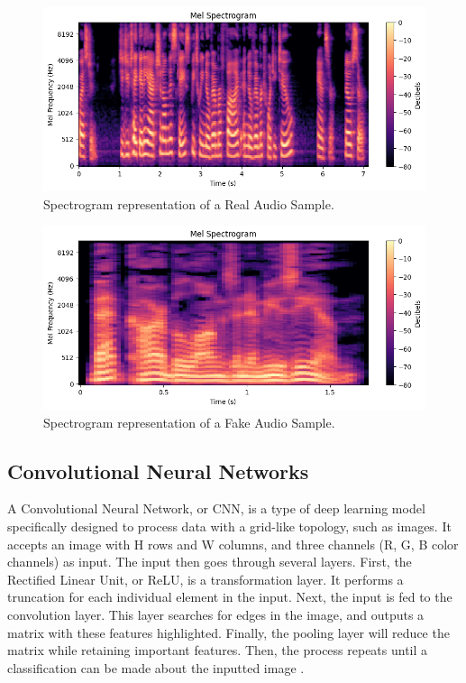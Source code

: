 \documentclass[conference]{IEEEtran}
\begin{document}
\begin{figure}
  \centering
  \includegraphics[width=\linewidth]{images/real_spectrogram.png}
  \caption{Spectrogram representation of a Real Audio Sample.}
  \label{fig:real_spectrogram}
\end{figure}

\begin{figure}
  \centering
  \includegraphics[width=\linewidth]{images/fake_spectrogram.png}
  \caption{Spectrogram representation of a Fake Audio Sample.}
  \label{fig:fake_spectrogram}
\end{figure}

\subsection{Convolutional Neural Networks}
A Convolutional Neural Network, or CNN, is a type of deep learning model specifically designed to process data with a grid-like topology, such as images. It accepts an image with H rows and W columns, and three channels (R, G, B color channels) as input. The input then goes through several layers. First, the Rectified Linear Unit, or ReLU, is a transformation layer. It performs a truncation for each individual element in the input. Next, the input is fed to the convolution layer. This layer searches for edges in the image, and outputs a matrix with these features highlighted. Finally, the pooling layer will reduce the matrix while retaining important features. Then, the process repeats until a classification can be made about the inputted image \cite{wu2017introduction}.
\end{document}
